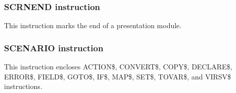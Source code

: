 \documentclass[letterpaper,10pt,english]{sphinxmanual}
\begin{document}
\subsubsection{SCRNEND instruction}
\label{\detokenize{User_Guide:scrnend-instruction}}
This instruction marks the end of a presentation module.

\begin{sphinxVerbatim}[commandchars=\\\{\}]
\end{sphinxVerbatim}


\subsubsection{SCENARIO instruction}
\label{\detokenize{User_Guide:scenario-instruction}}
This instruction encloses ACTION\$, CONVERT\$, COPY\$, DECLARE\$, ERROR\$, FIELD\$, GOTO\$, IF\$, MAP\$, SET\$, TOVAR\$, and VIRSV\$ instructions.
\end{document}
